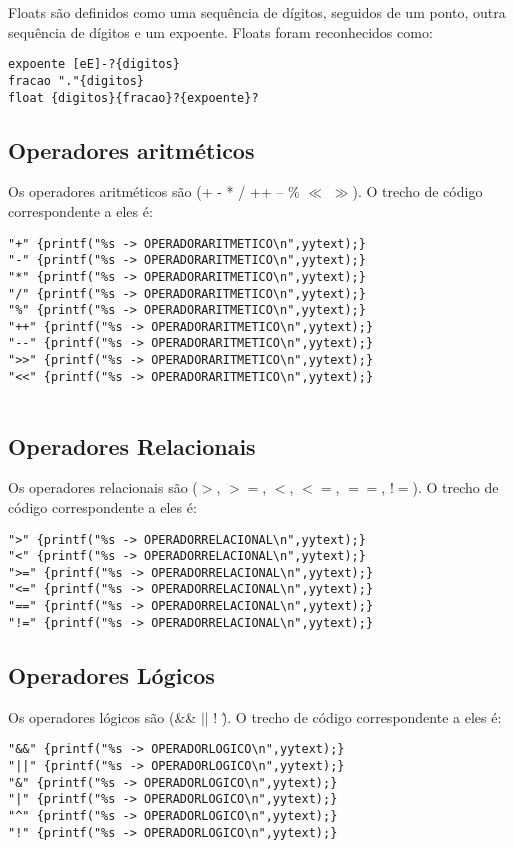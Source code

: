 \documentclass[a4paper,10pt]{article}
\begin{document}
Floats são definidos como uma sequência de dígitos, seguidos de um ponto, outra sequência de dígitos e um expoente. Floats foram
reconhecidos como:
\begin{verbatim}
expoente [eE]-?{digitos} 
fracao "."{digitos}
float {digitos}{fracao}?{expoente}?
\end{verbatim}  


  \subsection{Operadores aritméticos}
  Os operadores aritméticos são (+  -  *  /  ++  -- \% $\ll$ $\gg$). O trecho de código correspondente a eles é:
  \begin{verbatim}
"+" {printf("%s -> OPERADORARITMETICO\n",yytext);}
"-" {printf("%s -> OPERADORARITMETICO\n",yytext);}
"*" {printf("%s -> OPERADORARITMETICO\n",yytext);}
"/" {printf("%s -> OPERADORARITMETICO\n",yytext);}
"%" {printf("%s -> OPERADORARITMETICO\n",yytext);}
"++" {printf("%s -> OPERADORARITMETICO\n",yytext);}
"--" {printf("%s -> OPERADORARITMETICO\n",yytext);}
">>" {printf("%s -> OPERADORARITMETICO\n",yytext);}
"<<" {printf("%s -> OPERADORARITMETICO\n",yytext);}
  
  \end{verbatim}


  \subsection{Operadores Relacionais}
  Os operadores relacionais são ($>$, $>=$, $<$, $<=$, $==$, $!=$). O trecho de código correspondente a eles é:
  \begin{verbatim}
">" {printf("%s -> OPERADORRELACIONAL\n",yytext);}
"<" {printf("%s -> OPERADORRELACIONAL\n",yytext);}
">=" {printf("%s -> OPERADORRELACIONAL\n",yytext);}
"<=" {printf("%s -> OPERADORRELACIONAL\n",yytext);}
"==" {printf("%s -> OPERADORRELACIONAL\n",yytext);}
"!=" {printf("%s -> OPERADORRELACIONAL\n",yytext);}
  \end{verbatim}

  \subsection{Operadores Lógicos}
  Os operadores lógicos são (\&\& $||$ ! \^). O trecho de código correspondente a eles é:
  \begin{verbatim}
"&&" {printf("%s -> OPERADORLOGICO\n",yytext);}
"||" {printf("%s -> OPERADORLOGICO\n",yytext);}
"&" {printf("%s -> OPERADORLOGICO\n",yytext);}
"|" {printf("%s -> OPERADORLOGICO\n",yytext);}
"^" {printf("%s -> OPERADORLOGICO\n",yytext);}
"!" {printf("%s -> OPERADORLOGICO\n",yytext);}
  \end{verbatim}
\end{document}
